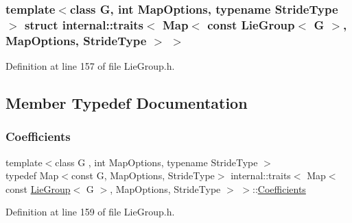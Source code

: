 \subsubsection*{template$<$class G, int Map\+Options, typename Stride\+Type$>$\newline
struct internal\+::traits$<$ Map$<$ const Lie\+Group$<$ G $>$, Map\+Options, Stride\+Type $>$ $>$}



Definition at line 157 of file Lie\+Group.\+h.



\subsection{Member Typedef Documentation}
\hypertarget{structinternal_1_1traits_3_01_map_3_01const_01_lie_group_3_01_g_01_4_00_01_map_options_00_01_stride_type_01_4_01_4_a8a1d9201a1ced7406d87434e78a1bb94}{}\label{structinternal_1_1traits_3_01_map_3_01const_01_lie_group_3_01_g_01_4_00_01_map_options_00_01_stride_type_01_4_01_4_a8a1d9201a1ced7406d87434e78a1bb94} 
\subsubsection{\texorpdfstring{Coefficients}{Coefficients}}
{\footnotesize\ttfamily template$<$class G , int Map\+Options, typename Stride\+Type $>$ \\
typedef Map$<$const G, Map\+Options, Stride\+Type$>$ internal\+::traits$<$ Map$<$ const \hyperlink{class_lie_group}{Lie\+Group}$<$ G $>$, Map\+Options, Stride\+Type $>$ $>$\+::\hyperlink{structinternal_1_1traits_3_01_map_3_01const_01_lie_group_3_01_g_01_4_00_01_map_options_00_01_stride_type_01_4_01_4_a8a1d9201a1ced7406d87434e78a1bb94}{Coefficients}}



Definition at line 159 of file Lie\+Group.\+h.

\hypertarget{structinternal_1_1traits_3_01_map_3_01const_01_lie_group_3_01_g_01_4_00_01_map_options_00_01_stride_type_01_4_01_4_a3aab625ff94db50623851510a4420ab0}{}\label{structinternal_1_1traits_3_01_map_3_01const_01_lie_group_3_01_g_01_4_00_01_map_options_00_01_stride_type_01_4_01_4_a3aab625ff94db50623851510a4420ab0} 
